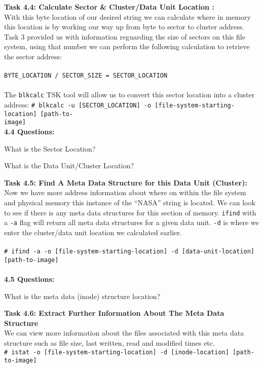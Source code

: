 \documentclass[a4paper,11pt]{article}
\begin{document}
{\noindent
\textbf{Task 4.4: Calculate Sector {\&} Cluster/Data Unit Location :}\\
With this byte location of our desired string we can calculate where in memory this location is by working our way up from byte to sector to cluster address.
Task 3 provided us with information reguarding the size of sectors on this file system, using that number we can perform the following calculation to retrieve the sector address:\\ \\ 
\texttt{BYTE\_LOCATION / SECTOR\_SIZE = SECTOR\_LOCATION}\\ \\
The \texttt{blkcalc} TSK tool will allow us to convert this sector location into a cluster address:
\texttt{{\#} blkcalc -u [SECTOR\_LOCATION] -o [file-system-starting-location] [path-to-\\image]}
\\

\noindent
\textbf{4.4 Questions:}
\begin{enumerate*}
	\item What is the Sector Location?
	\item What is the Data Unit/Cluster Location?\\
\end{enumerate*}
}
{\noindent
\textbf{Task 4.5: Find A Meta Data Structure for this Data Unit (Cluster):}\\
Now we have more address information about where on within the file system and physical memory this instance of the ``NASA'' string is located. We can look to see if there is any meta data structures for this section of memory. \texttt{ifind} with a \texttt{-a} flag will return all meta data structures for a given data unit. \texttt{-d} is where we enter the cluster/data unit location we calculated earlier.\\ 
\\
\texttt{{\#} ifind -a -o [file-system-starting-location] -d [data-unit-location] [path-to-image] }\\
\\
\noindent
\textbf{4.5 Questions:}
\begin{enumerate*}
	\item What is the meta data (inode) structure location?\\
\end{enumerate*}
}
{\noindent
\textbf{Task 4.6: Extract Further Information About The Meta Data Structure}\\
We can view more information about the files associated with this meta data structure such as file size, last written, read and modified times etc.\\
\texttt{{\#} istat -o [file-system-starting-location] -d [inode-location] [path-to-image] }\\
\\
}
\end{document}
